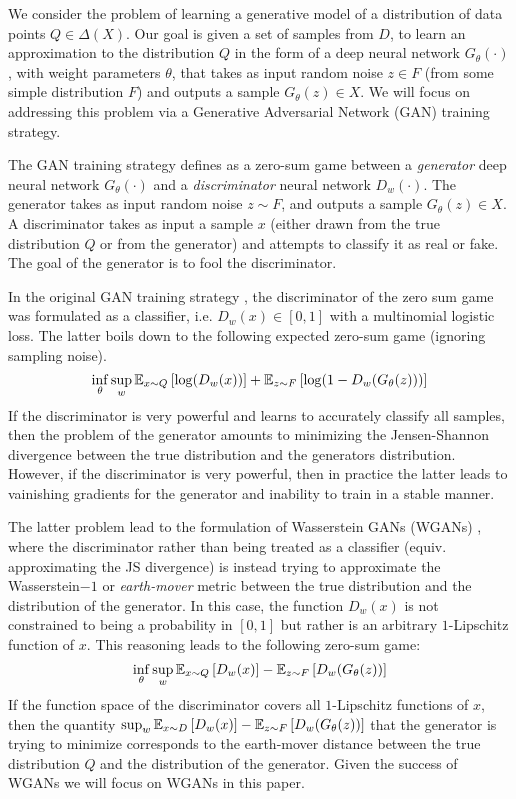 We consider the problem of learning a generative model of a distribution of data points $Q \in \Delta(X)$. Our goal is given a set of samples from $D$, to learn an approximation to the distribution $Q$ in the form of a deep neural network $G_{\theta}(\cdot)$, with weight parameters $\theta$, that takes as input random noise $z\in F$ (from some simple distribution $F$) and outputs a sample $G_{\theta}(z)\in X$. We will focus on addressing this problem via a Generative Adversarial Network (GAN) training strategy.

The GAN training strategy defines as a zero-sum game between a \emph{generator} deep neural network $G_{\theta}(\cdot)$ and a \emph{discriminator} neural network $D_{w}(\cdot)$. The generator takes as input random noise $z\sim F$, and outputs a sample $G_{\theta}(z)\in X$. A discriminator takes as input a sample $x$ (either drawn from the true distribution $Q$ or from the generator) and attempts to classify it as real or fake. The goal of the generator is to fool the discriminator.

In the original GAN training strategy \cite{Goodfellow14}, the discriminator of the zero sum game was formulated as a classifier, i.e. $D_w(x)\in [0,1]$ with a multinomial logistic loss. The latter boils down to the following expected zero-sum game (ignoring sampling noise). 
\begin{equation}
\inf_{\theta} \sup_{w} \mathbb{E}_{x\sim Q}\left[ \log(D_w(x))\right] + \mathbb{E}_{z\sim F}\left[\log(1- D_{w}(G_{\theta}(z)))\right]
\end{equation} 
If the discriminator is very powerful and learns to accurately classify all samples, then the problem of the generator amounts to minimizing the Jensen-Shannon divergence between the true distribution and the generators distribution. However, if the discriminator is very powerful, then in practice the latter leads to vainishing gradients for the generator and inability to train in a stable manner.

The latter problem lead to the formulation of Wasserstein GANs (WGANs) \cite{arjovsky2017wasserstein}, where the discriminator rather than being treated as a classifier (equiv. approximating the JS divergence) is instead trying to approximate the Wasserstein$-1$ or \emph{earth-mover} metric between the true distribution and the distribution of the generator. In this case, the function $D_w(x)$ is not constrained to being a probability in $[0,1]$ but rather is an arbitrary $1$-Lipschitz function of $x$. This reasoning leads to the following zero-sum game:
\begin{equation}\label{eqn:wgan}
\inf_{\theta} \sup_{w} \mathbb{E}_{x\sim Q}\left[ D_w(x) \right] - \mathbb{E}_{z\sim F}\left[D_w(G_\theta(z))\right]
\end{equation}
If the function space of the discriminator covers all $1$-Lipschitz functions of $x$, then the quantity $\sup_{w} \mathbb{E}_{x\sim D}\left[ D_w(x) \right] - \mathbb{E}_{z\sim F}\left[D_w(G_\theta(z))\right]$ that the generator is trying to minimize corresponds to the earth-mover distance between the true distribution $Q$ and the distribution of the generator. Given the success of WGANs we will focus on WGANs in this paper.


